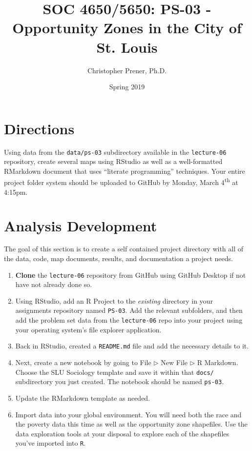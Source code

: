 \documentclass{tufte-handout}
\title{SOC 4650/5650: PS-03 - Opportunity Zones in the City of St. Louis}
\author{Christopher Prener, Ph.D.}
\date{Spring 2019}
\begin{document}
\maketitle %

\vspace{5mm}
\section{Directions}
Using data from the \texttt{data/ps-03} subdirectory available in the \texttt{lecture-06} repository, create several maps using RStudio as well as a well-formatted RMarkdown document that uses ``literate programming'' techniques. Your entire project folder system should be uploaded to GitHub by Monday, March 4\textsuperscript{th} at 4:15pm.

\vspace{5mm}
\section{Analysis Development}
The goal of this section is to create a self contained project directory with all of the data, code, map documents, results, and documentation a project needs.
\begin{enumerate}[label=\alph*.]
\item \textbf{Clone} the \texttt{lecture-06} repository from GitHub using GitHub Desktop if not have not already done so.
\item Using RStudio, add an R Project to the \textit{existing} directory in your assignments repository named \texttt{PS-03}. Add the relevant subfolders, and then add the problem set data from the \texttt{lecture-06} repo into your project using your operating system's file explorer application.
\item Back in RStudio, created a \texttt{README.md} file and add the necessary details to it.
\item Next, create a new notebook by going to \textsf{File $\triangleright$ New File $\triangleright$} {\color{red}\textsf{R Markdown}}. Choose the SLU Sociology template and save it within that \texttt{docs/} subdirectory you just created. The notebook should be named \texttt{ps-03}.
\item Update the RMarkdown template as needed.
\item Import data into your global environment. You will need both the race and the poverty data this time as well as the opportunity zone shapefiles. Use the data exploration tools at your disposal to explore each of the shapefiles you've imported into \texttt{R}.
\end{enumerate}
\end{document}
